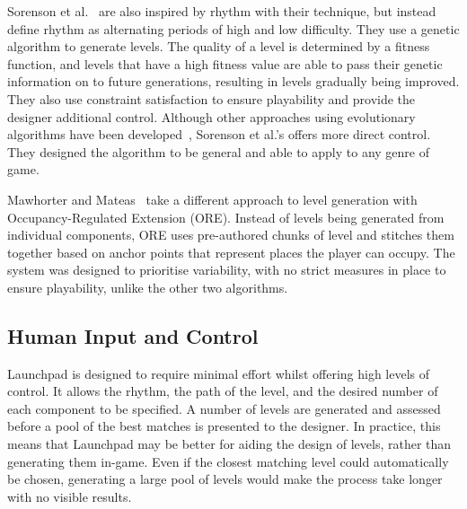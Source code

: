 \documentclass{scrartcl}
\begin{document}
Sorenson et al.~\cite{sorenson:generic} are also inspired by rhythm with their technique, but instead define rhythm as alternating periods of high and low difficulty. They use a genetic algorithm to generate levels. The quality of a level is determined by a fitness function, and levels that have a high fitness value are able to pass their genetic information on to future generations, resulting in levels gradually being improved. They also use constraint satisfaction to ensure playability and provide the designer additional control. Although other approaches using evolutionary algorithms have been developed~\cite{mourato:genetic}, Sorenson et al.'s offers more direct control. They designed the algorithm to be general and able to apply to any genre of game.

Mawhorter and Mateas~\cite{mawhorter:occupancy} take a different approach to level generation with Occupancy-Regulated Extension (ORE). Instead of levels being generated from individual components, ORE uses pre-authored chunks of level and stitches them together based on anchor points that represent places the player can occupy. The system was designed to prioritise variability, with no strict measures in place to ensure playability, unlike the other two algorithms.

\subsection{Human Input and Control}
Launchpad is designed to require minimal effort whilst offering high levels of control. It allows the rhythm, the path of the level, and the desired number of each component to be specified. A number of levels are generated and assessed before a pool of the best matches is presented to the designer. In practice, this means that Launchpad may be better for aiding the design of levels, rather than generating them in-game. Even if the closest matching level could automatically be chosen, generating a large pool of levels would make the process take longer with no visible results.
\end{document}
